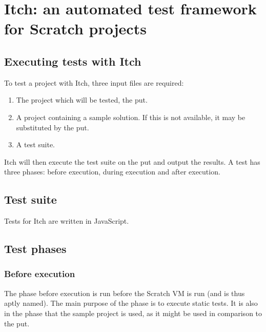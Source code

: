 \documentclass[main]{subfiles}
\begin{document}
\chapter{Itch: an automated test framework for Scratch projects}
\label{ch:itch:-an-automated-test-framework-for-scratch-projects}



\section{Executing tests with Itch}\label{sec:executing-tests-with-itch}


To test a project with Itch, three input files are required:

\begin{enumerate}
    \item The project which will be tested, the \acrfull{put}.
    \item A project containing a sample solution.
          If this is not available, it may be substituted by the \acrshort{put}.
    \item A test suite.
\end{enumerate}

Itch will then execute the test suite on the \acrshort{put} and output the results.
A test has three phases: before execution, during execution and after execution.


\section{Test suite}\label{sec:test-suite}

Tests for Itch are written in JavaScript.

\section{Test phases}\label{sec:test-phases}

\subsection{Before execution}\label{subsec:before-execution}

The phase before execution is run before the Scratch VM is run (and is thus aptly named).
The main purpose of the phase is to execute static tests.
It is also in the phase that the sample project is used, as it might be used in comparison to the \acrshort{put}.
\end{document}
